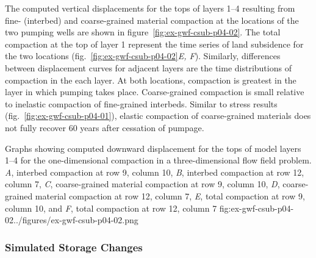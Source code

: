 The computed vertical displacements for the tops of layers 1--4 resulting from fine- (interbed) and coarse-grained material compaction at the locations of the two pumping wells are shown in figure~\ref{fig:ex-gwf-csub-p04-02}. The total compaction at the top of layer 1 represent the time series of land subsidence for the two locations (fig.~\ref{fig:ex-gwf-csub-p04-02}\textit{E, F}). Similarly, differences between displacement curves for adjacent layers are the time distributions of compaction in the each layer. At both locations, compaction is greatest in the layer in which pumping takes place. Coarse-grained compaction is small relative to inelastic compaction of fine-grained interbeds. Similar to stress results (fig.~\ref{fig:ex-gwf-csub-p04-01}), elastic compaction of coarse-grained materials does not fully recover 60 years after cessation of pumpage.

\begin{StandardFigure}{
                                     Graphs showing computed  downward displacement for the tops of model 
                                     layers 1--4 for the one-dimensional compaction in a three-dimensional flow 
                                     field problem. \textit{A}, interbed compaction at row 9, column 10, \textit{B}, 
                                     interbed compaction at row 12, column 7, \textit{C}, coarse-grained material 
                                     compaction at row 9, column 10, \textit{D}, coarse-grained material 
                                     compaction at row 12, column 7, \textit{E}, total compaction at row 9, 
                                     column 10, and \textit{F}, total compaction at row 12, column 7
                                     }{fig:ex-gwf-csub-p04-02}{../figures/ex-gwf-csub-p04-02.png}
\end{StandardFigure}                                 

\subsubsection{Simulated Storage Changes}

